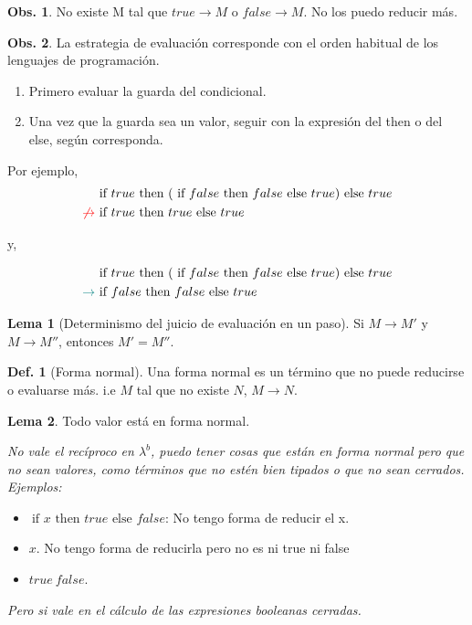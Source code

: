 \documentclass{report}
\theoremstyle{definition} %
\newtheorem{lemma}{Lema}[chapter]
\newtheorem{definition}{Def.}[chapter]
\newtheorem{observation}{Obs.}[chapter]
\newcommand{\lambdab}{\lambda^b}
\newcommand{\ifte}[3]{\ \text{if } #1 \text{ then } #2 \text{ else } #3}
\newcommand{\app}[2]{#1 \ #2} %
\newcommand{\reduces}{\to}
\newcommand{\reduce}[2]{#1 \reduces #2}
\begin{document}
\begin{observation}
    No existe M tal que $\reduce{true}{M}$ o $\reduce{false}{M}$. No los puedo reducir más.
\end{observation}

\begin{observation}
    La estrategia de evaluación corresponde con el orden habitual de los
    lenguajes de programación.

    \begin{enumerate}
        \item Primero evaluar la guarda del condicional.
        \item Una vez que la guarda sea un valor, seguir con la expresión del
        then o del else, según corresponda.
    \end{enumerate}

    Por ejemplo,
    \begin{align*}
        &\ifte
            {true}
            {(\ifte{false}{false}{true})}
            {true}\\
        \textcolor{red}{\not\to} &\ifte{true}{true}{true}
    \end{align*}

    y,

    \begin{align*}
        &\ifte
            {true}
            {(\ifte{false}{false}{true})}
            {true}\\
        \textcolor{teal}{\to} &\ifte{false}{false}{true}
    \end{align*}
\end{observation}

\begin{lemma}[Determinismo del juicio de evaluación en un paso]
    Si $\reduce{M}{M'}$ y $\reduce{M}{M''}$, entonces $M' = M''$.
\end{lemma}

\begin{definition}[Forma normal]
    Una forma normal es un término que no puede reducirse o evaluarse más. i.e
    $M$ tal que no existe $N$, $\reduce{M}{N}$.
\end{definition}
\begin{lemma}
    Todo valor está en forma normal.

    \textit{No vale el recíproco en $\lambdab$, puedo tener cosas que están en forma normal pero que no sean valores, como términos que no estén bien tipados o que no sean cerrados. Ejemplos:}
    
    \begin{itemize}
        \item $\ifte{x}{true}{false}$: No tengo forma de reducir el x.
        \item $x$. No tengo forma de reducirla pero no es ni true ni false
        \item $\app{true}{false}$.
    \end{itemize}
    
    \textit{Pero si vale en el cálculo de las expresiones booleanas cerradas.}
\end{lemma}
\end{document}
